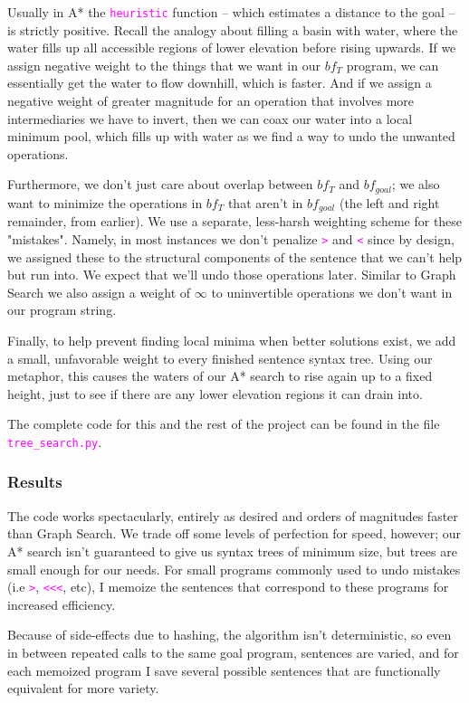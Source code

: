 \documentclass[runningheads]{llncs}
\newcommand{\code}[1]{\texttt{\textcolor{magenta}{\setlength{\fboxsep}{1pt}\colorbox{lightgray!20}{#1}}}}
\begin{document}
Usually in A* the \code{heuristic} function -- which estimates a distance to the goal -- is strictly positive. Recall the analogy about filling a basin with water, where the water fills up all accessible regions of lower elevation before rising upwards. If we assign negative weight to the things that we want in our $bf_{T}$ program, we can essentially get the water to flow downhill, which is faster. And if we assign a negative weight of greater magnitude for an operation that involves more intermediaries we have to invert, then we can coax our water into a local minimum pool, which fills up with water as we find a way to undo the unwanted operations.

Furthermore, we don't just care about overlap between $bf_{T}$ and $bf_{goal}$; we also want to minimize the operations in $bf_{T}$ that aren't in $bf_{goal}$ (the left and right remainder, from earlier). We use a separate, less-harsh weighting scheme for these "mistakes". Namely, in most instances we don't penalize \code{>} and \code{<} since by design, we assigned these to the structural components of the sentence that we can't help but run into. We expect that we'll undo those operations later. Similar to Graph Search we also assign a weight of $\infty$ to uninvertible operations we don't want in our program string.

Finally, to help prevent finding local minima when better solutions exist, we add a small, unfavorable weight to every finished sentence syntax tree. Using our metaphor, this causes the waters of our A* search to rise again up to a fixed height, just to see if there are any lower elevation regions it can drain into.

The complete code for this and the rest of the project can be found in the file \code{tree\_search.py}.

\subsubsection*{Results}
The code works spectacularly, entirely as desired and orders of magnitudes faster than Graph Search. We trade off some levels of perfection for speed, however; our A* search isn't guaranteed to give us syntax trees of minimum size, but trees are small enough for our needs. For small programs commonly used to undo mistakes (i.e \code{>}, \code{<<<}, etc), I memoize the sentences that correspond to these programs for increased efficiency.

Because of side-effects due to hashing, the algorithm isn't deterministic, so even in between repeated calls to the same goal program, sentences are varied, and for each memoized program I save several possible sentences that are functionally equivalent for more variety.
\end{document}
